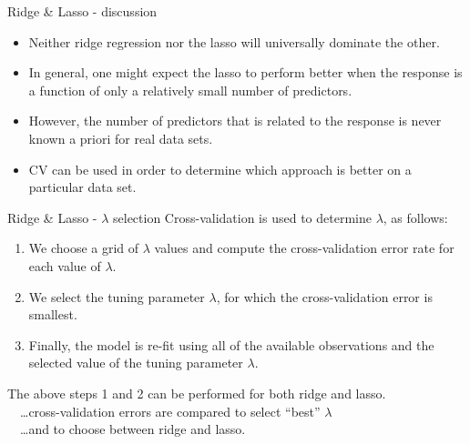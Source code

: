 \documentclass{beamer}
\begin{document}
\begin{frame}{Ridge \& Lasso - discussion}
\begin{itemize}
\item Neither ridge regression nor the lasso will universally dominate the other.
\medskip
\item In general, one might expect the lasso to perform better
when the response is a function of only a relatively small
number of predictors.
\medskip
\item However, the number of predictors that is related to the
response is never known a priori for real data sets.
\medskip
\item CV can be used in order to determine which approach is better on a particular data set.
\end{itemize}
\end{frame}
\begin{frame}{Ridge \& Lasso - $\lambda$ selection}
Cross-validation is used to determine $\lambda$, as follows:
\bigskip
\begin{enumerate}
\item We choose a grid of $\lambda$ values and compute the
cross-validation error rate for each value of $\lambda$.
\medskip
\item We select the tuning parameter $\lambda$, for which the
cross-validation error is smallest.
\medskip
\item Finally, the model is re-fit using all of the available
observations and the selected value of the tuning
parameter $\lambda$.
\end{enumerate}
\bigskip
The above steps 1 and 2 can be performed for both ridge and lasso.\\
~~\dots cross-validation errors are compared to select ``best'' $\lambda$ \\
~~\dots and to choose between ridge and lasso.

\end{frame}
\end{document}
